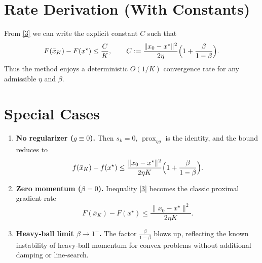 \documentclass{article}
\newcommand{\prox}{\operatorname{prox}}
\begin{document}
\section*{Rate Derivation (With Constants)}
From \eqref{3} we can write the explicit constant $C$ such that
\[
F(\bar{x}_K)-F(x^\star)\le \frac{C}{K},
\qquad 
C:=\frac{\|x_0-x^\star\|^{2}}{2\eta}\Bigl(1+\frac{\beta}{1-\beta}\Bigr).
\]
Thus the method enjoys a deterministic $O(1/K)$ convergence rate for any admissible $\eta$ and $\beta$.

\section*{Special Cases}
\begin{enumerate}
\item \textbf{No regularizer ($g\equiv0$).}  
Then $s_{k}=0$, $\prox_{\eta g}$ is the identity, and the bound reduces to
\[
f(\bar{x}_K)-f(x^\star)\le \frac{\|x_0-x^\star\|^{2}}{2\eta K}
\Bigl(1+\frac{\beta}{1-\beta}\Bigr).
\]
\item \textbf{Zero momentum ($\beta=0$).}  
Inequality \eqref{3} becomes the classic proximal gradient rate
\[
F(\bar{x}_K)-F(x^\star)\le \frac{\|x_0-x^\star\|^{2}}{2\eta K}.
\]
\item \textbf{Heavy‑ball limit $\beta\rightarrow 1^{-}$.}  
The factor $\frac{\beta}{1-\beta}$ blows up, reflecting the known instability of heavy‑ball momentum for convex problems without additional damping or line‑search.
\end{enumerate}
\end{document}
